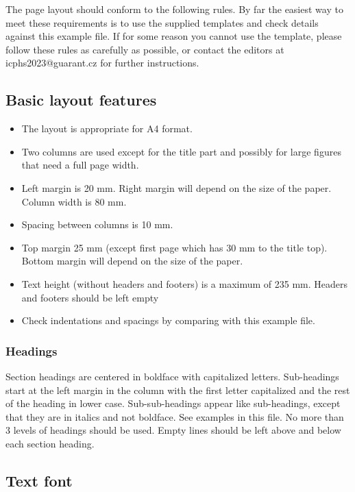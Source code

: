 \documentclass[a4paper,11pt,twocolumn]{article}
\begin{document}
The page layout should conform to the following rules. By far the easiest way to meet these requirements is to use the supplied templates and check details against this example file. If for some reason you cannot use the template, please follow these rules as carefully as possible, or contact the editors at icphs2023@guarant.cz for further instructions.

\subsection{Basic layout features}

\begin{itemize}
\item The layout is appropriate for A4 format.
\item Two columns are used
  except for the title part and possibly for large figures that need a
  full page width.
\item Left margin is 20 mm. Right margin will depend on
  the size of the paper. Column width is 80 mm.
\item Spacing between
  columns is 10 mm.
\item Top margin 25 mm (except first page which has 30
  mm to the title top). Bottom margin will depend on the size of the
  paper.
\item Text height (without headers and footers) is a maximum of
  235 mm.  Headers and footers should be left empty
\item Check indentations
  and spacings by comparing with this example file.
\end{itemize}

\subsubsection{Headings}

Section headings are centered in boldface with capitalized letters. Sub-headings start at the left margin in the column with the first letter capitalized and the rest of the heading in lower case. Sub-sub-headings appear like sub-headings, except that they are in italics and not boldface. See examples in this file. No more than 3 levels of headings should be used.  Empty lines should be left above and below each section heading.

\subsection{Text font}
\end{document}
